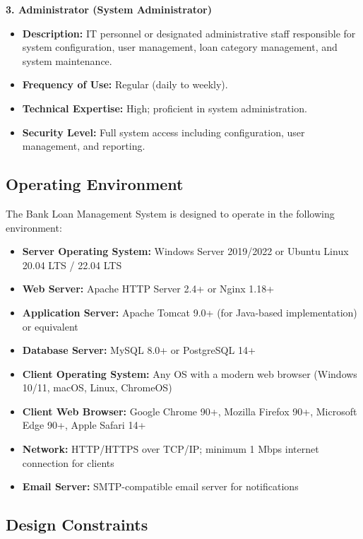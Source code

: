 \documentclass[12pt,a4paper,oneside]{report}
\begin{document}
\textbf{3. Administrator (System Administrator)}

\begin{itemize}
  \item \textbf{Description:} IT personnel or designated administrative staff responsible for system configuration, user management, loan category management, and system maintenance.
  \item \textbf{Frequency of Use:} Regular (daily to weekly).
  \item \textbf{Technical Expertise:} High; proficient in system administration.
  \item \textbf{Security Level:} Full system access including configuration, user management, and reporting.
\end{itemize}

\subsection{Operating Environment}

The Bank Loan Management System is designed to operate in the following environment:

\begin{itemize}
  \item \textbf{Server Operating System:} Windows Server 2019/2022 or Ubuntu Linux 20.04 LTS / 22.04 LTS
  \item \textbf{Web Server:} Apache HTTP Server 2.4+ or Nginx 1.18+
  \item \textbf{Application Server:} Apache Tomcat 9.0+ (for Java-based implementation) or equivalent
  \item \textbf{Database Server:} MySQL 8.0+ or PostgreSQL 14+
  \item \textbf{Client Operating System:} Any OS with a modern web browser (Windows 10/11, macOS, Linux, ChromeOS)
  \item \textbf{Client Web Browser:} Google Chrome 90+, Mozilla Firefox 90+, Microsoft Edge 90+, Apple Safari 14+
  \item \textbf{Network:} HTTP/HTTPS over TCP/IP; minimum 1 Mbps internet connection for clients
  \item \textbf{Email Server:} SMTP-compatible email server for notifications
\end{itemize}

\subsection{Design Constraints}
\end{document}
